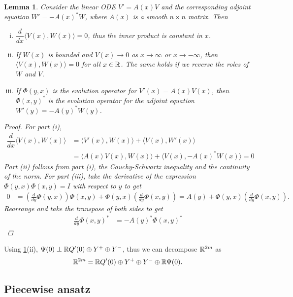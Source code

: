 \documentclass[10pt,reqno]{amsart}
\theoremstyle{plain}
\newtheorem{lemma}[theorem]{Lemma}
\theoremstyle{definition}
\theoremstyle{remark}
\numberwithin{theorem}{section}
\numberwithin{equation}{section}
\begin{document}
\begin{lemma}\label{eigadjoint}
Consider the linear ODE $V' = A(x)V$ and the corresponding adjoint equation $W' = -A(x)^* W$, where $A(x)$ is a smooth $n \times n$ matrix. Then
\begin{enumerate}[(i)]
\item $\dfrac{d}{dx}\langle V(x), W(x) \rangle = 0$, thus the inner product is constant in $x$.
\item If $W(x)$ is bounded and $V(x) \rightarrow 0$ as $x \rightarrow \infty$ or $x \rightarrow -\infty$, then $\langle V(x), W(x) \rangle = 0$ for all $x \in \mathbb{R}$. The same holds if we reverse the roles of $W$ and $V$.
\item If $\Phi(y, x)$ is the evolution operator for $V'(x) = A(x)V(x)$, then $\Phi(x, y)^*$ is the evolution operator for the adjoint equation $W'(y) = -A(y)^* W(y)$.
\end{enumerate}
\begin{proof}
For part (i), 
\begin{align*}
\dfrac{d}{dx}\langle V(x), W(x) \rangle &= 
\langle V'(x), W(x) \rangle + \langle V(x), W'(x) \rangle \\
&= \langle A(x)V(x), W(x) \rangle + \langle V(x), -A(x)^* W(x) \rangle = 0
\end{align*}
Part (ii) follows from part (i), the Cauchy-Schwartz inequality and the continuity of the norm. For part (iii), take the derivative of the expression $\Phi(y, x)\Phi(x, y) = I$ with respect to $y$ to get
\begin{align*}
0 &= \left(\frac{d}{dy}\Phi(y, x)\right) \Phi(x, y) +
\Phi(y, x)\left(\frac{d}{dy}\Phi(x, y)\right) 
= A(y) + \Phi(y, x)\left(\frac{d}{dy}\Phi(x, y)\right).
\end{align*}
Rearrange and take the transpose of both sides to get
\begin{align*}
\frac{d}{dy}\Phi(x, y)^* &= -A(y)^* \Phi(x, y)^*  
\end{align*}
\end{proof}
\end{lemma}

\noi Using \cref{eigadjoint}(ii), $\Psi(0) \perp \mathbb{R} Q'(0) \oplus Y^+ \oplus Y^-$, thus we can decompose $\mathbb{R}^{2m}$ as
\begin{equation}\label{R2mdecomp}
\mathbb{R}^{2m} = \mathbb{R} Q'(0) \oplus Y^+ \oplus Y^- \oplus \mathbb{R} \Psi(0).
\end{equation}

\subsection{Piecewise ansatz}
\end{document}
